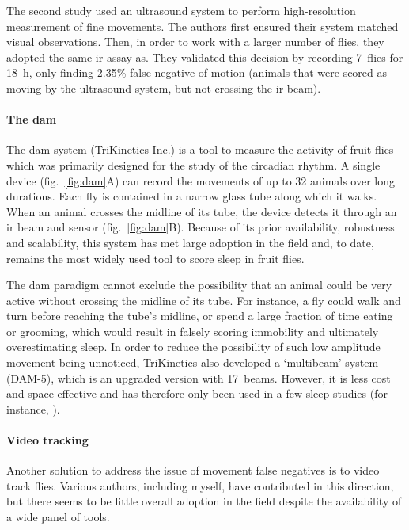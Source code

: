 The second study used an ultrasound system to perform high-resolution measurement of fine movements\cite{shaw_correlates_2000}.
The authors first ensured their system matched visual observations.
Then, in order to work with a larger number of flies, they adopted the same \gls{ir} assay as\cite{hendricks_rest_2000}.
They validated this decision by recording 7~flies for 18~h, only finding 2.35\% false negative of motion (animals that were scored as moving by the ultrasound system, but not crossing the \gls{ir} beam).



\paragraph*{The \acrfull{dam}}
\label{par:dam}
The \gls{dam} system (TriKinetics Inc.) is a tool to measure the activity of fruit flies which was primarily designed for the study of the circadian rhythm\cite{hamblen_germ-line_1986}.
A single device (fig.~\ref{fig:dam}A)
can record the movements of up to 32 animals over long durations.
Each fly is contained in a narrow glass tube along which it walks.
When an animal crosses the midline of its tube, the device detects it through an \gls{ir} beam and sensor (fig.~\ref{fig:dam}B).
Because of its prior availability, robustness and scalability, this system has met large adoption in the field and, to date, remains the most widely used tool to score sleep in fruit flies.



The \gls{dam} paradigm cannot exclude the possibility that an animal could be very active without crossing the midline of its tube.
For instance, a fly could walk and turn before reaching the tube's midline, or spend a large fraction of time eating or grooming, which would result in falsely scoring immobility and ultimately overestimating sleep\cite{zwaka_context_2015}.
In order to reduce the possibility of such low amplitude movement being unnoticed, TriKinetics also developed a `multibeam' system (DAM-5), 
which is an upgraded version with 17~beams. 
However, it is less cost and space effective and has therefore only been used in a few sleep studies
(for instance, \cite{garbe_context-specific_2015,dilley_behavioral_2018}).

\paragraph*{Video tracking} Another solution to address the issue of movement false negatives is to video track flies.
Various authors, including myself, have contributed in this direction\cite{zimmerman_video_2008,donelson_high-resolution_2012,gilestro_video_2012,faville_how_2015,murphy_postprandial_2016,geissmann_ethoscopes_2017}, but there seems to be little overall adoption in the field despite the availability of a wide panel of tools.

